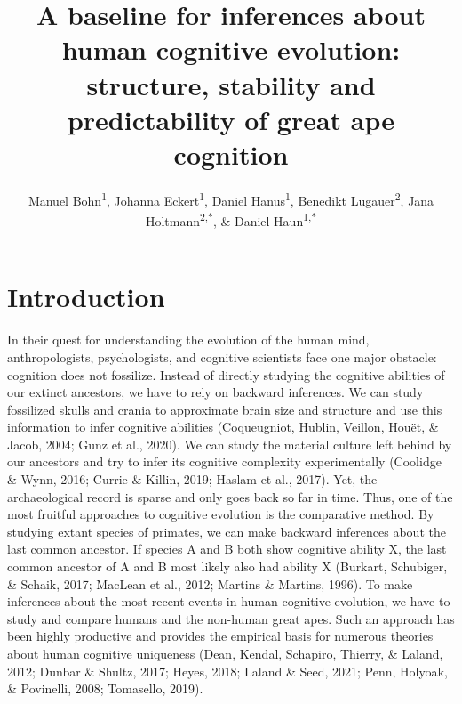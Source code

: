 \documentclass[
  man,floatsintext]{apa6}
\title{A baseline for inferences about human cognitive evolution: structure, stability and predictability of great ape cognition}
\author{Manuel Bohn\textsuperscript{1}, Johanna Eckert\textsuperscript{1}, Daniel Hanus\textsuperscript{1}, Benedikt Lugauer\textsuperscript{2}, Jana Holtmann\textsuperscript{2,*}, \& Daniel Haun\textsuperscript{1,*}}
\date{}
\affiliation{\vspace{0.5cm}\textsuperscript{1} Department of Comparative Cultural Psychology, Max Planck Institute for Evolutionary Anthropology, Leipzig, Germany\\\textsuperscript{2} Psychologische Hochschule Berlin, Berlin, Germany\\\textsuperscript{*} Shared senior authorship}
\begin{document}
\maketitle

\hypertarget{introduction}{%
\section{Introduction}\label{introduction}}

In their quest for understanding the evolution of the human mind, anthropologists, psychologists, and cognitive scientists face one major obstacle: cognition does not fossilize. Instead of directly studying the cognitive abilities of our extinct ancestors, we have to rely on backward inferences. We can study fossilized skulls and crania to approximate brain size and structure and use this information to infer cognitive abilities (Coqueugniot, Hublin, Veillon, Houët, \& Jacob, 2004; Gunz et al., 2020). We can study the material culture left behind by our ancestors and try to infer its cognitive complexity experimentally (Coolidge \& Wynn, 2016; Currie \& Killin, 2019; Haslam et al., 2017). Yet, the archaeological record is sparse and only goes back so far in time. Thus, one of the most fruitful approaches to cognitive evolution is the comparative method. By studying extant species of primates, we can make backward inferences about the last common ancestor. If species A and B both show cognitive ability X, the last common ancestor of A and B most likely also had ability X (Burkart, Schubiger, \& Schaik, 2017; MacLean et al., 2012; Martins \& Martins, 1996). To make inferences about the most recent events in human cognitive evolution, we have to study and compare humans and the non-human great apes. Such an approach has been highly productive and provides the empirical basis for numerous theories about human cognitive uniqueness (Dean, Kendal, Schapiro, Thierry, \& Laland, 2012; Dunbar \& Shultz, 2017; Heyes, 2018; Laland \& Seed, 2021; Penn, Holyoak, \& Povinelli, 2008; Tomasello, 2019).
\end{document}
